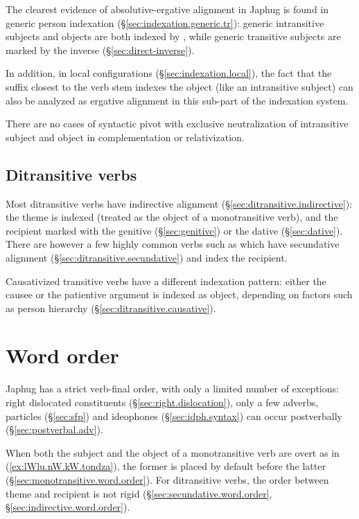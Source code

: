 The clearest evidence of absolutive-ergative alignment in Japhug is found in generic person indexation (§\ref{sec:indexation.generic.tr}): generic intransitive subjects and objects are both indexed by , while generic transitive subjects are marked by the inverse  (§\ref{sec:direct-inverse}).

In addition, in local configurations (§\ref{sec:indexation.local}), the fact that the suffix closest to the verb stem indexes the object (like an intransitive subject) can also be analyzed as ergative alignment in this sub-part of the indexation system.

There are no cases of syntactic pivot with exclusive neutralization of intransitive subject and object in complementation or relativization. 

\subsection{Ditransitive verbs}
Most ditransitive verbs have indirective alignment (§\ref{sec:ditransitive.indirective}): the theme is indexed (treated as the object of a monotransitive verb), and the recipient marked with the genitive (§\ref{sec:genitive}) or the dative (§\ref{sec:dative}). There are however a few highly common verbs such as  which have secundative alignment (§\ref{sec:ditransitive.secundative}) and index the recipient.

Causativized transitive verbs have a different indexation pattern: either the causee or the patientive argument is indexed as object, depending on factors such as person hierarchy (§\ref{sec:ditransitive.causative}).

\section{Word order} \label{sec:word.order.introduction}
Japhug has a strict verb-final order, with only a limited number of exceptions: right dislocated constituents (§\ref{sec:right.dislocation}), only a few adverbs, particles (§\ref{sec:sfp}) and ideophones (§\ref{sec:idph.syntax}) can occur postverbally (§\ref{sec:postverbal.adv}).

When both the subject and the object of a monotransitive verb are overt as in (\ref{ex:lWlu.nW.kW.tondza}), the former is placed by default before the latter (§\ref{sec:monotransitive.word.order}). For ditransitive verbs, the order between theme and recipient is not rigid (§\ref{sec:secundative.word.order}, §\ref{sec:indirective.word.order}).


